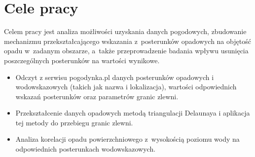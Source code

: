 \section{Cele pracy}
\label{sec:cele}
Celem pracy jest analiza możliwości uzyskania danych pogodowych, zbudowanie mechanizmu przekształcającego wskazania z~posterunków opadowych na objętość opadu w~zadanym obszarze, a~także przeprowadzenie badania wpływu usunięcia poszczególnych posterunków na wartości wynikowe.

\begin{itemize}
\item
Odczyt z serwisu pogodynka.pl danych posterunków opadowych i wodowskazowych (takich jak nazwa i lokalizacja), wartości odpowiednich wskazań posterunków oraz parametrów granic zlewni.
\item
Przekształcenie danych opadowych metodą triangulacji Delaunaya i aplikacja tej metody do przebiegu granic zlewni.
\item
Analiza korelacji opadu powierzchniowego z~wysokością poziomu wody na odpowiednich posterunkach wodowskazowych.
\end{itemize}